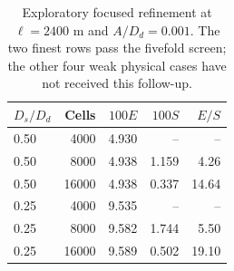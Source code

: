 \begin{table}[htbp]\centering\small
\begin{tabular}{lrrrr}\toprule
$D_s/D_d$ & Cells & $100E$ & $100S$ & $E/S$ \\
\midrule
0.50 & 4000 & 4.930 & -- & -- \\
0.50 & 8000 & 4.938 & 1.159 & 4.26 \\
0.50 & 16000 & 4.938 & 0.337 & 14.64 \\
0.25 & 4000 & 9.535 & -- & -- \\
0.25 & 8000 & 9.582 & 1.744 & 5.50 \\
0.25 & 16000 & 9.589 & 0.502 & 19.10 \\
\bottomrule\end{tabular}
\caption{Exploratory focused refinement at $\ell=2400$ m and $A/D_d=0.001$. The two finest rows pass the fivefold screen; the other four weak physical cases have not received this follow-up.}\end{table}
